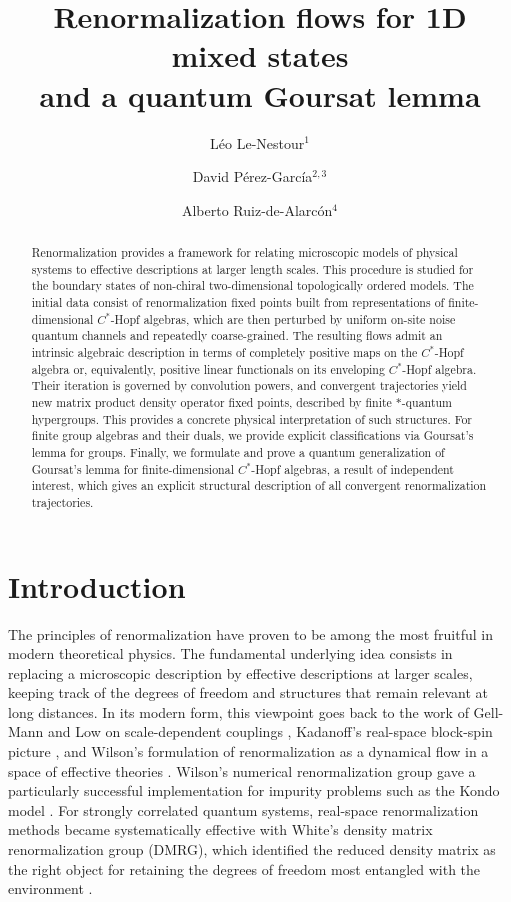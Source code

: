 \documentclass[a4paper,10pt]{amsart}
\title[Renormalization flows for 1D mixed states and a quantum Goursat lemma]{Renormalization flows for 1D mixed states\\and a quantum Goursat lemma}
\author[L.~Le-Nestour]{L\'eo Le-Nestour$^1$}
\author[D.~P\'erez-Garc\'ia]{David P\'erez-Garc\'ia$^{2,3}$}
\author[A.~Ruiz-de-Alarc\'on]{Alberto Ruiz-de-Alarc\'on$^{4}$}
\theoremstyle{definition}
\begin{document}
\begin{abstract}
Renormalization provides a framework for relating microscopic models of physical systems to effective descriptions at larger length scales. This procedure is studied for the boundary states of non-chiral two-dimensional topologically ordered models. The initial data consist of renormalization fixed points built from representations of finite-dimensional $C^*$-Hopf algebras, which are then perturbed by uniform on-site noise quantum channels and repeatedly coarse-grained. The resulting flows admit an intrinsic algebraic description in terms of completely positive maps on the $C^*$-Hopf algebra or, equivalently, positive linear functionals on its enveloping $C^*$-Hopf algebra. Their iteration is governed by convolution powers, and convergent trajectories yield new matrix product density operator fixed points, described by finite $*$-quantum hypergroups. This provides a concrete physical interpretation of such structures. For finite group algebras and their duals, we provide explicit classifications via Goursat's lemma for groups. Finally, we formulate and prove a quantum generalization of Goursat's lemma for finite-dimensional $C^*$-Hopf algebras, a result of independent interest, which gives an explicit structural description of all convergent renormalization trajectories.
\end{abstract}

\maketitle

\section{Introduction}
\label{sec:intro}

The principles of renormalization have proven to be among the most fruitful in modern theoretical physics.
The fundamental underlying idea consists in replacing a microscopic description by effective descriptions at larger scales, keeping track of the degrees of freedom and structures that remain relevant at long distances.
In its modern form, this viewpoint goes back to the work of Gell-Mann and Low on scale-dependent couplings \cite{gell-mann_quantum_1954}, Kadanoff's real-space block-spin picture \cite{kadanoff_scaling_1966}, and Wilson's formulation of renormalization as a dynamical flow in a space of effective theories \cite{wilson_renormalization_1971,wilson_renormalization_1971-1}.
Wilson's numerical renormalization group gave a particularly successful implementation for impurity problems such as the Kondo model \cite{wilson_renormalization_1975}.
For strongly correlated quantum systems, real-space renormalization methods became systematically effective with White's density matrix renormalization group (DMRG), which identified the reduced density matrix as the right object for retaining the degrees of freedom most entangled with the environment \cite{white_density_1992}.
\end{document}
